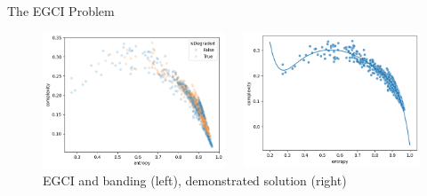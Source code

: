 \begin{frame}{The EGCI Problem}
    \centering
    \begin{figure}
        \begin{columns}
            \begin{column}{0.5\textwidth}
                \includegraphics[height=\textheight,width=\textwidth,keepaspectratio]{images/egci_problem_labeled.png}
            \end{column}
            \begin{column}{0.5\textwidth}
                \includegraphics[height=\textheight,width=\textwidth,keepaspectratio]{images/egci_solution.png}
            \end{column}
        \end{columns}
        \caption{EGCI and banding (left), demonstrated solution (right)}
    \end{figure}
\end{frame}
